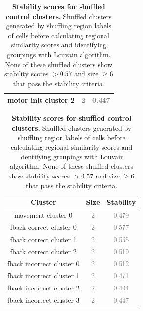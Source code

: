 \begin{table}[ht]
\begin{minipage}{0.32\textwidth}
\begin{tabular}{c|c|c}
motor init cluster 2 & \textcolor{gray}{2} & \textcolor{gray}{0.447} \\ \hline
\end{tabular}
\end{minipage}
\hfill
\begin{minipage}{0.32\textwidth}
\scriptsize
\setlength{\tabcolsep}{3pt}
\renewcommand{\arraystretch}{0.95}
\begin{tabular}{c|c|c}
\hline
\textbf{Cluster} & \textbf{Size} & \textbf{Stability} \\ \hline
movement cluster 0 & \textcolor{gray}{2} & \textcolor{gray}{0.479} \\ \hline
fback correct cluster 0 & \textcolor{gray}{2} & \textcolor{gray}{0.577} \\ \hline
fback correct cluster 1 & \textcolor{gray}{2} & \textcolor{gray}{0.555} \\ \hline
fback correct cluster 2 & \textcolor{gray}{2} & \textcolor{gray}{0.519} \\ \hline
fback incorrect cluster 0 & \textcolor{gray}{2} & \textcolor{gray}{0.512} \\ \hline
fback incorrect cluster 1 & \textcolor{gray}{2} & \textcolor{gray}{0.471} \\ \hline
fback incorrect cluster 2 & \textcolor{gray}{2} & \textcolor{gray}{0.404} \\ \hline
fback incorrect cluster 3 & \textcolor{gray}{2} & \textcolor{gray}{0.447} \\ \hline
\end{tabular}
\end{minipage}
\caption{\textbf{Stability scores for shuffled control clusters.} Shuffled clusters generated by shuffling region labels of cells before calculating regional similarity scores and identifying groupings with Louvain algorithm. None of these shuffled clusters show stability scores $>0.57$ and size $\geq6$ that pass the stability criteria.}
\label{tab:shuffled_cluster_stability}
\end{table}

\FloatBarrier

